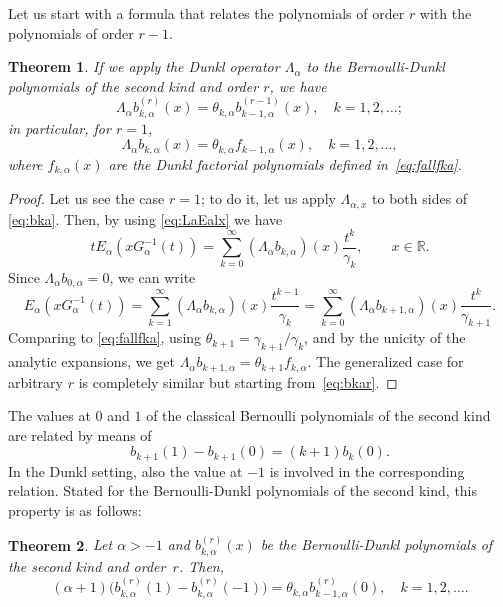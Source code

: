 \documentclass[11pt]{article}
\theoremstyle{plain}
\newtheorem{theorem}{Theorem}[section]
\theoremstyle{remark}
\numberwithin{equation}{section} %
\newcommand{\Ea}{E_{\alpha}}
\newcommand{\La}{\Lambda_{\alpha}}
\newcommand{\Lax}{\Lambda_{\alpha,x}}
\newcommand{\RR}{\mathbb{R}}
\newcommand{\cc}{\gamma}
\begin{document}
Let us start with a formula that relates the polynomials of order $r$ with
the polynomials of order $r-1$.

\begin{theorem}
\label{teo:Labka}
If we apply the Dunkl operator $\La$ to the Bernoulli-Dunkl polynomials of the second kind and order $r$, we have
\[
  \La b_{k,\alpha}^{(r)}(x) = \theta_{k,\alpha} b_{k-1,\alpha}^{(r-1)}(x),
  \quad k=1,2,\ldots;
\]
in particular, for $r=1$,
\[
  \La b_{k,\alpha} (x) = \theta_{k,\alpha} f_{k-1,\alpha}(x),
  \quad k=1,2,\ldots,
\]
where $f_{k,\alpha}(x)$ are the Dunkl factorial polynomials defined in~\eqref{eq:fallfka}.
\end{theorem}

\begin{proof}
Let us see the case $r=1$; to do it, let us apply $\Lax$ to both sides of \eqref{eq:bka}.
Then, by using \eqref{eq:LaEalx} we have
\[
  t \Ea(x G_{\alpha}^{-1}(t)) 
  = \sum_{k=0}^{\infty} (\La b_{k,\alpha})(x) \frac{t^k}{\cc_{k}}, 
  \qquad x \in \RR.
\]
Since $\La b_{0,\alpha} = 0$, we can write
\[
  \Ea(x G_{\alpha}^{-1}(t)) 
  = \sum_{k=1}^{\infty} (\La b_{k,\alpha})(x) \frac{t^{k-1}}{\cc_{k}} 
  = \sum_{k=0}^{\infty} (\La b_{k+1,\alpha})(x) \frac{t^{k}}{\cc_{k+1}}.
\]
Comparing to \eqref{eq:fallfka}, using $\theta_{k+1} = \cc_{k+1}/\cc_{k}$, and by the unicity of the analytic expansions,
we get $\La b_{k+1,\alpha} = \theta_{k+1} f_{k,\alpha}$.
The generalized case for arbitrary $r$ is completely similar but starting from~\eqref{eq:bkar}.
\end{proof}

The values at $0$ and $1$ of the classical Bernoulli polynomials 
of the second kind are related by means of
\[
  b_{k+1}(1) - b_{k+1}(0) = (k+1)b_k(0).
\]
In the Dunkl setting, also the value at $-1$ is involved in the corresponding relation.
Stated for the Bernoulli-Dunkl polynomials of the second kind, 
this property is as follows:

\begin{theorem}
\label{teo:rel01-1}
Let $\alpha>-1$ and $b_{k,\alpha}^{(r)}(x)$ be the Bernoulli-Dunkl polynomials of the second kind and order~$r$. Then, 
\begin{equation}
\label{eq:rel01-1}
  (\alpha+1) \big( b_{k,\alpha}^{(r)}(1)-b_{k,\alpha}^{(r)}(-1) \big)
  = \theta_{k,\alpha} b_{k-1,\alpha}^{(r)}(0),
  \quad k= 1,2,\ldots.
\end{equation}
\end{theorem}
\end{document}
